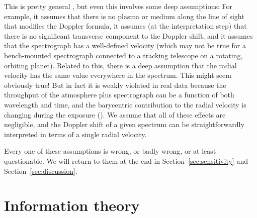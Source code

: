 \documentclass[modern]{aastex631}
\newcommand{\sectionname}{Section}
\newcommand{\secref}[1]{\sectionname~\ref{#1}}
\begin{document}
\begin{description}
    This is pretty general \citep{wright}, but even this involves some deep assumptions:
    For example, it assumes that there is no plasma or medium along the line of sight that modifies the Doppler formula,
    it assumes (at the interpretation step) that there is no significant transverse component to the Doppler shift,
    and it assumes that the spectrograph has a well-defined velocity (which may not be true for a bench-mounted spectrograph connected to a tracking telescope on a rotating, orbiting planet).
    Related to this, there is a deep assumption that the radial velocity has the same value everywhere in the spectrum.
    This might seem obviously true!
    But in fact it is weakly violated in real data because the throughput of the atmosphere plus spectrograph can be a function of both wavelength and time, and the barycentric contribution to the radial velocity is changing during the exposure (\citealt{berv-lambda}). 
    We assume that all of these effects are negligible, and the Doppler shift of a given spectrum can be straightforwardly interpreted in terms of a single radial velocity.
\end{description}
Every one of these assumptions is wrong, or badly wrong, or at least questionable.
We will return to them at the end in \secref{sec:sensitivity} and \secref{sec:discussion}.

\section{Information theory}\label{sec:info}
\end{document}
